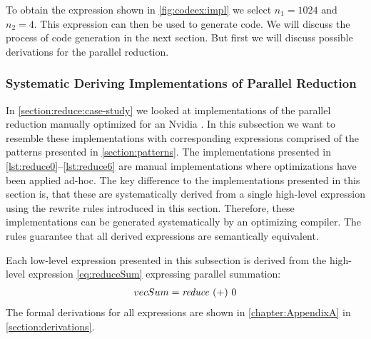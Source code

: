 To obtain the expression shown in \autoref{fig:codeex:impl} we select $n_1=1024$ and $n_2=4$.
This expression can then be used to generate \OpenCL code.
We will discuss the process of \OpenCL code generation in the next section.
But first we will discuss possible derivations for the parallel reduction.












\subsubsection{Systematic Deriving Implementations of Parallel Reduction}
\label{sec:deriving:reduce}

In \autoref{section:reduce:case-study} we looked at implementations of the parallel reduction manually optimized for an Nvidia \GPU.
In this subsection we want to resemble these implementations with corresponding expressions comprised of the patterns presented in \autoref{section:patterns}.
The implementations presented in \autoref{lst:reduce0}--\autoref{lst:reduce6} are manual implementations where optimizations have been applied ad-hoc.
The key difference to the implementations presented in this section is, that these are systematically derived from a single high-level expression using the rewrite rules introduced in this section.
Therefore, these implementations can be generated systematically by an optimizing compiler.
The rules guarantee that all derived expressions are semantically equivalent.

Each \OpenCL low-level expression presented in this subsection is derived from the high-level expression \autoref{eq:reduceSum} expressing parallel summation:
\begin{align}
  vecSum = \text{\textit{reduce}}\ (+)\ 0
  \label{eq:reduceSum}
\end{align}
%
The formal derivations for all expressions are shown in \autoref{chapter:AppendixA} in \autoref{section:derivations}.

